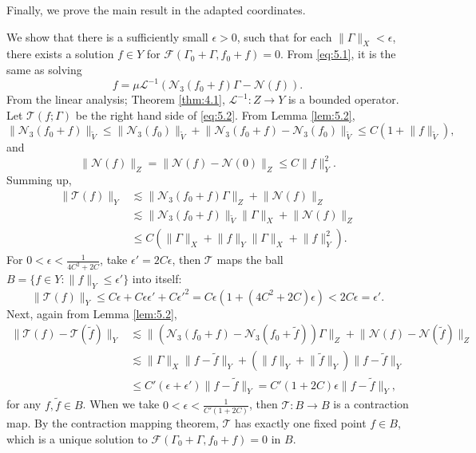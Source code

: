 \documentclass[11pt]{article}
\makeatletter
\renewenvironment{proof}[1][\proofname]{\par
  \vspace{-.7\topsep}%
  \pushQED{\qed}%
  \normalfont
  \topsep0pt \partopsep0pt %
  \trivlist
  \item[\hskip\labelsep
        \itshape
    #1\@addpunct{.}]\ignorespaces
}{%
  \popQED\endtrivlist\@endpefalse
  \addvspace{6pt plus 6pt} %
}
\theoremstyle{definition}
\theoremstyle{remark}
\numberwithin{equation}{section}
\newcommand{\mcal}{\mathcal}
\renewcommand{\tilde}{\widetilde}
\newcommand{\norm}[1]{\lVert #1 \rVert}
\makeatother
\begin{document}
Finally, we prove the main result in the adapted coordinates.

\begin{proof}[Proof of Theorem \ref{thm:2.1}]
We show that there is a sufficiently small $\epsilon > 0$, such that for each $\norm{\Gamma}_{X} < \epsilon$, there exists a solution $f\in Y$ for $\mcal{F}(\Gamma_0 + \Gamma, f_0 + f) = 0$. From \eqref{eq:5.1}, it is the same as solving
\begin{equation} \label{eq:5.2}
f = \mu \mcal{L}^{-1}( \mcal{N}_3(f_0 + f) \Gamma - \mcal{N}(f) ).
\end{equation}
From the linear analysis; Theorem \ref{thm:4.1}, $\mcal{L}^{-1} : Z \to Y$ is a bounded operator. Let $\mcal{T}(f;\Gamma)$ be the right hand side of \eqref{eq:5.2}. From Lemma \ref{lem:5.2},
\[ \norm{\mcal{N}_3(f_0 + f)}_{\tilde{V}} \leq \norm{\mcal{N}_3(f_0)}_{\tilde{V}} + \norm{\mcal{N}_3(f_0 + f) - \mcal{N}_3(f_0)}_{\tilde{V}} \leq C(1 + \norm{f}_{\tilde{V}}), \]
and
\[ \norm{\mcal{N}(f)}_Z = \norm{\mcal{N}(f) - \mcal{N}(0)}_Z \leq C\norm{f}_{Y}^2.\]
Summing up,
\begin{align*}
\norm{\mcal{T}(f)}_Y &\lesssim \norm{\mcal{N}_3 (f_0 + f) \Gamma}_{Z} + \norm{\mcal{N}(f)}_Z \\
&\lesssim \norm{\mcal{N}_3 (f_0 + f)}_{\tilde{V}} \norm{\Gamma}_X + \norm{\mcal{N}(f)}_Z \\
&\leq C(\norm{\Gamma}_X + \norm{f}_Y \norm{\Gamma}_X + \norm{f}_Y^2).
\end{align*}
For $0<\epsilon < \frac{1}{4C^2 + 2C}$, take $\epsilon' = 2C\epsilon$, then $\mcal{T}$ maps the ball $B = \{f\in Y : \norm{f}_Y \leq \epsilon'\}$ into itself:
\[ \norm{\mcal{T}(f)}_Y \leq C\epsilon + C\epsilon \epsilon' + C \epsilon'^2 = C\epsilon( 1 + (4C^2 + 2C)\epsilon) < 2C\epsilon = \epsilon'. \]
Next, again from Lemma \ref{lem:5.2},
\begin{align*}
\norm{\mcal{T}(f) - \mcal{T}(\tilde{f})}_Y &\lesssim \norm{(\mcal{N}_3 (f_0 + f) - \mcal{N}_3 (f_0 + \tilde{f})) \Gamma}_Z + \norm{\mcal{N}(f) - \mcal{N}(\tilde{f})}_Z \\
&\lesssim \norm{\Gamma}_X \norm{f-\tilde{f}}_Y + (\norm{f}_Y + \norm{\tilde{f}}_Y) \norm{f-\tilde{f}}_Y \\
&\leq C'(\epsilon + \epsilon') \norm{f-\tilde{f}}_Y = C'(1+2C) \epsilon \norm{f-\tilde{f}}_Y,
\end{align*}
for any $f,\tilde{f} \in B$. When we take $0<\epsilon < \frac{1}{C'(1 + 2C)}$, then $\mcal{T} : B \to B$ is a contraction map. By the contraction mapping theorem, $\mcal{T}$ has exactly one fixed point $f\in B$, which is a unique solution to $\mcal{F}(\Gamma_0 + \Gamma, f_0 + f) = 0$ in $B$.
\end{proof}
\end{document}
